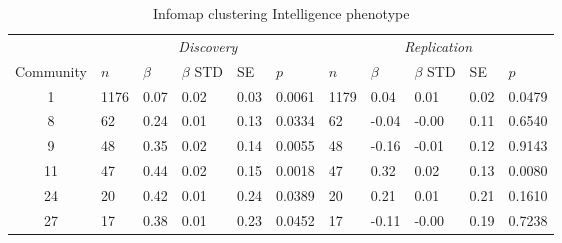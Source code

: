 \begin{table}[ht]
\centering
\setlength{\extrarowheight}{2pt}
\begin{tabular}{cllllllllll}
  \toprule
   &  \multicolumn{5}{c}{\textit{Discovery}} & \multicolumn{5}{c}{\textit{Replication}} \\
    \cmidrule{2-11}
Community & $n$ & $\beta$ & $\beta$ STD & SE & $p$ & $n$ & $\beta$ & $\beta$ STD & SE & $p$\\ 
  \midrule
1 & 1176 & 0.07 & 0.02 & 0.03 & 0.0061 & 1179 & 0.04 & 0.01 & 0.02 & 0.0479 \\ 
  8 & 62 & 0.24 & 0.01 & 0.13 & 0.0334 & 62 & -0.04 & -0.00 & 0.11 & 0.6540 \\ 
  9 & 48 & 0.35 & 0.02 & 0.14 & 0.0055 & 48 & -0.16 & -0.01 & 0.12 & 0.9143 \\ 
  11 & 47 & 0.44 & 0.02 & 0.15 & 0.0018 & 47 & 0.32 & 0.02 & 0.13 & 0.0080 \\ 
  24 & 20 & 0.42 & 0.01 & 0.24 & 0.0389 & 20 & 0.21 & 0.01 & 0.21 & 0.1610 \\ 
  27 & 17 & 0.38 & 0.01 & 0.23 & 0.0452 & 17 & -0.11 & -0.00 & 0.19 & 0.7238 \\ 
   \bottomrule
\end{tabular}
\caption{Infomap clustering Intelligence phenotype} 
\label{tab:Infomap clustering Intelligence phenotype}
\end{table}
